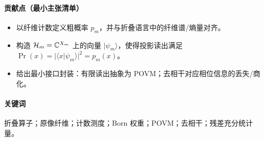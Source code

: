 \begin{abstract}
本文以“分辨率折叠所致的观测非单射”为出发点：在有限窗模型中，折叠映射 $\Fold_m:\Omega_m\twoheadrightarrow X_m$ 诱导原像纤维 $\mathcal F_m(x)=\Fold_m^{-1}(x)$，从而在均匀微测度下得到粗结果概率
$
p_m(x)=\abs{\mathcal F_m(x)}/\abs{\Omega_m}.
$
证明该计数概率可在有效 Hilbert 表述下写成 Born 权重，从而无需将 Born 规则作为新增公理。并在此基础上给出有限分辨率读出的最小量子接口封装：状态为正算子，读出为效应分解（POVM），去相干为相位记录丢失所诱导的商化/通道化。
\end{abstract}

\paragraph{贡献点（最小主张清单）}
\begin{itemize}
  \item 以纤维计数定义粗概率 $p_m$，并与折叠语言中的纤维谱/熵量对齐。
  \item 构造 $\mathcal H_m=\mathbb{C}^{X_m}$ 上的向量 $|\psi_m\rangle$，使得投影读出满足 $\Pr(x)=|\langle x|\psi_m\rangle|^2=p_m(x)$。
  \item 给出最小接口封装：有限读出抽象为 POVM；去相干对应相位信息的丢失/商化。
\end{itemize}

\paragraph{关键词}
折叠算子；原像纤维；计数测度；Born 权重；POVM；去相干；残差充分统计量。

